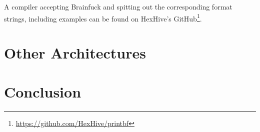 \documentclass[article]{uibk}
\begin{document}
A compiler accepting Brainfuck and spitting out the corresponding format
strings, including examples can be found on HexHive's
GitHub\footnote{\url{https://github.com/HexHive/printbf}}.

\newpage

\section{Other Architectures}

\newpage

\section{Conclusion}


\end{document}
